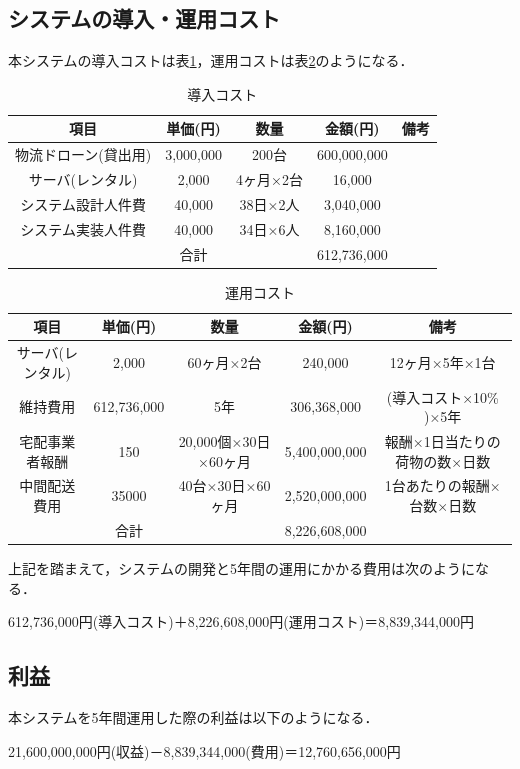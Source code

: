 \documentclass[a4paper, titlepage]{jsarticle}
\begin{document}
\subsection{システムの導入・運用コスト}
本システムの導入コストは表\ref{tab:label1}，運用コストは表\ref{tab:label2}のようになる．
\begin{table}[H]
  \centering
  \caption{導入コスト}
  \begin{tabular}{c c c c c}
    \hline
    項目 & 単価(円) & 数量 & 金額(円) & 備考 \\
    \hline \hline
    物流ドローン(貸出用) & 3,000,000 & 200台 & 600,000,000 & \\
    サーバ(レンタル) & 2,000 & 4ヶ月×2台 & 16,000 & \\
    システム設計人件費 & 40,000 & 38日×2人 & 3,040,000 & \\
    システム実装人件費 & 40,000 & 34日×6人 & 8,160,000 & \\
    \hline \hline
    & 合計 & & 612,736,000 & \\
    \hline
  \end{tabular}
  \label{tab:label1}
\end{table}

\begin{table}[H]
  \centering
  \caption{運用コスト}
  \begin{tabular}{c c c c c}
    \hline
    項目 & 単価(円) & 数量 & 金額(円) & 備考 \\
    \hline \hline
    サーバ(レンタル) & 2,000 & 60ヶ月×2台 & 240,000 & 12ヶ月×5年×1台 \\
    維持費用 & 612,736,000 & 5年 & 306,368,000 & (導入コスト×10\% )×5年 \\
    宅配事業者報酬 & 150 & 20,000個×30日×60ヶ月 & 5,400,000,000 & 報酬×1日当たりの荷物の数×日数 \\
    中間配送費用 & 35000 & 40台×30日×60ヶ月 & 2,520,000,000 & 1台あたりの報酬×台数×日数 \\
    \hline \hline
    & 合計 & & 8,226,608,000 & \\
    \hline
  \end{tabular}
  \label{tab:label2}
\end{table}

上記を踏まえて，システムの開発と5年間の運用にかかる費用は次のようになる．
\begin{center}
  612,736,000円(導入コスト)＋8,226,608,000円(運用コスト)＝8,839,344,000円
\end{center}

\subsection{利益}
本システムを5年間運用した際の利益は以下のようになる．
\begin{center}
  21,600,000,000円(収益)－8,839,344,000(費用)＝12,760,656,000円
\end{center}
\end{document}
